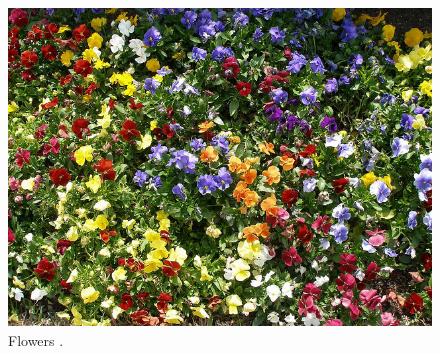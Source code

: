 \begin{refsection}
  \begin{figure}
    \centering
    \includegraphics[scale=0.05]{tikz_img/flowers.jpg}
    \caption{Flowers \cite{turner06:_flower}.}
    \label{fig:flowers}
  \end{figure}

  \FloatBarrier

  \printbibliography[heading=subbibliography]

\end{refsection}